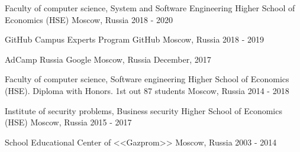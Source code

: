 

\cventryeducation
{Faculty of computer science, System and Software Engineering} %
{Higher School of Economics (HSE)} %
{Moscow, Russia} %
{2018 - 2020} %

\cventryeducation
{GitHub Campus Experts Program} %
{GitHub} %
{Moscow, Russia} %
{2018 - 2019} %

\cventryeducation
{AdCamp Russia} %
{Google} %
{Moscow, Russia} %
{December, 2017} %

\cventryeducation
{Faculty of computer science, Software engineering} %
{Higher School of Economics (HSE). Diploma with Honors. 1st out 87 students} %
{Moscow, Russia} %
{2014 - 2018} %

\cventryeducation
{Institute of security problems, Business security} %
{Higher School of Economics (HSE)} %
{Moscow, Russia} %
{2015 - 2017} %

\cventryeducation
{School} %
{Educational Center of <<Gazprom>>} %
{Moscow, Russia} %
{2003 - 2014} %


